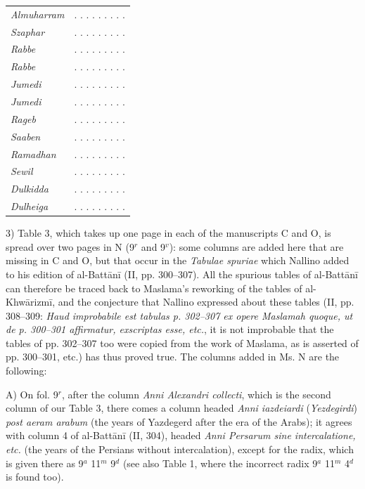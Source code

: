 \documentclass[11pt]{article}
\begin{document}
\begin{center}\small\begin{tabular}{ll}
\emph{Almuharram} & . . . . . . . . . \\
\emph{Szaphar} & . . . . . . . . . \\
\emph{Rabbe} & . . . . . . . . . \\
\emph{Rabbe} & . . . . . . . . . \\
\emph{Jumedi} & . . . . . . . . . \\
\emph{Jumedi} & . . . . . . . . . \\
\emph{Rageb} & . . . . . . . . . \\
\emph{Saaben} & . . . . . . . . . \\
\emph{Ramadhan} & . . . . . . . . . \\
\emph{Sewil} & . . . . . . . . . \\
\emph{Dulkidda} & . . . . . . . . . \\
\emph{Dulheiga} & . . . . . . . . . \\
\end{tabular}\end{center}
\par 3) Table 3, which takes up one page in each of the manuscripts C and O, is spread over two pages in N (9$^{r}$ and 9$^{v}$): some columns are added here that are missing in C and O, but that occur in the \emph{Tabulae spuriae} which Nallino added to his edition of al-Battānī (II, pp. 300–307). All the spurious tables of al-Battānī can therefore be traced back to Maslama's reworking of the tables of al-Khwārizmī, and the conjecture that Nallino expressed about these tables (II, pp. 308–309: \emph{Haud improbabile est tabulas p. 302–307 ex opere Maslamah quoque, ut de p. 300–301 affirmatur, exscriptas esse, etc.}, it is not improbable that the tables of pp. 302–307 too were copied from the work of Maslama, as is asserted of pp. 300–301, etc.) has thus proved true. The columns added in Ms. N are the following:\par
\par A) On fol. 9$^{r}$, after the column \emph{Anni Alexandri collecti}, which is the second column of our Table 3, there comes a column headed \emph{Anni iazdeiardi} (\emph{Yezdegirdi}) \emph{post aeram arabum} (the years of Yazdegerd after the era of the Arabs); it agrees with column 4 of al-Battānī (II, 304), headed \emph{Anni Persarum sine intercalatione, etc.} (the years of the Persians without intercalation), except for the radix, which is given there as 9$^{a}$ 11$^{m}$ 9$^{d}$ (see also Table 1, where the incorrect radix 9$^{a}$ 11$^{m}$ 4$^{d}$ is found too).\par
\end{document}
